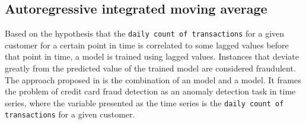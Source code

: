 \subsection{Autoregressive integrated moving average}

Based on the hypothesis that the \texttt{daily count of transactions} for a given customer for a certain point in time is correlated to some lagged values before that point in time, a model is trained using lagged values. Instances that deviate greatly from the predicted value of the trained model are considered fraudulent.
The approach  proposed in \cite{fd_ARIMA} is the combination of an  model and a  model. It frames the problem of credit card fraud detection as an anomaly detection task in time series, where the variable presented as the time series is the \texttt{daily count of transactions} for a given customer.

